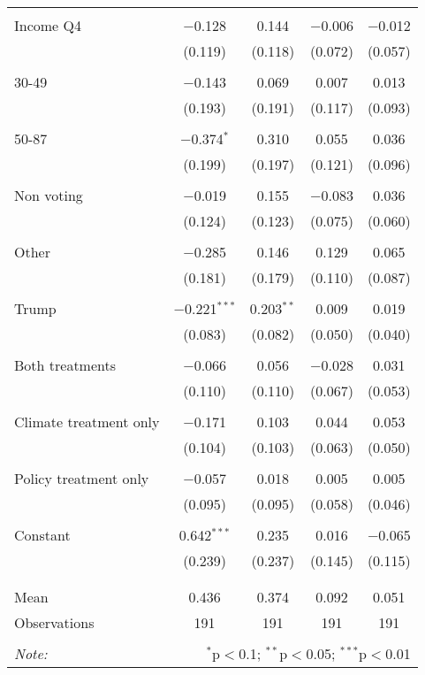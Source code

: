 \begin{tabular}{@{\extracolsep{5pt}}lcccc}
  & & & & \\ 
 Income Q4 & $-$0.128 & 0.144 & $-$0.006 & $-$0.012 \\ 
  & (0.119) & (0.118) & (0.072) & (0.057) \\ 
  & & & & \\ 
 30-49 & $-$0.143 & 0.069 & 0.007 & 0.013 \\ 
  & (0.193) & (0.191) & (0.117) & (0.093) \\ 
  & & & & \\ 
 50-87 & $-$0.374$^{*}$ & 0.310 & 0.055 & 0.036 \\ 
  & (0.199) & (0.197) & (0.121) & (0.096) \\ 
  & & & & \\ 
 Non voting & $-$0.019 & 0.155 & $-$0.083 & 0.036 \\ 
  & (0.124) & (0.123) & (0.075) & (0.060) \\ 
  & & & & \\ 
 Other & $-$0.285 & 0.146 & 0.129 & 0.065 \\ 
  & (0.181) & (0.179) & (0.110) & (0.087) \\ 
  & & & & \\ 
 Trump & $-$0.221$^{***}$ & 0.203$^{**}$ & 0.009 & 0.019 \\ 
  & (0.083) & (0.082) & (0.050) & (0.040) \\ 
  & & & & \\ 
 Both treatments & $-$0.066 & 0.056 & $-$0.028 & 0.031 \\ 
  & (0.110) & (0.110) & (0.067) & (0.053) \\ 
  & & & & \\ 
 Climate treatment only & $-$0.171 & 0.103 & 0.044 & 0.053 \\ 
  & (0.104) & (0.103) & (0.063) & (0.050) \\ 
  & & & & \\ 
 Policy treatment only & $-$0.057 & 0.018 & 0.005 & 0.005 \\ 
  & (0.095) & (0.095) & (0.058) & (0.046) \\ 
  & & & & \\ 
 Constant & 0.642$^{***}$ & 0.235 & 0.016 & $-$0.065 \\ 
  & (0.239) & (0.237) & (0.145) & (0.115) \\ 
  & & & & \\ 
\hline \\[-1.8ex] 
Mean & 0.436 & 0.374 & 0.092 & 0.051 \\ 
Observations & 191 & 191 & 191 & 191 \\ 
\hline 
\hline \\[-1.8ex] 
\textit{Note:}  & \multicolumn{4}{r}{$^{*}$p$<$0.1; $^{**}$p$<$0.05; $^{***}$p$<$0.01} \\ 
\end{tabular} 
